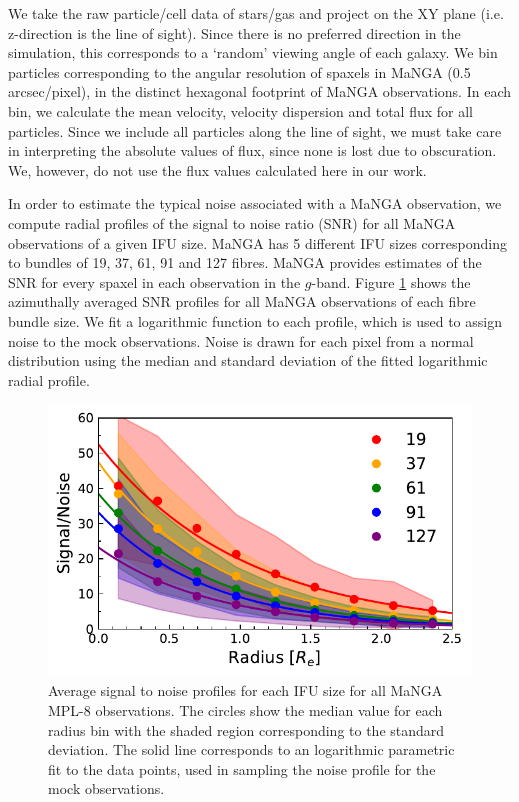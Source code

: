 We take the raw particle/cell data of stars/gas and project on the XY plane (i.e. z-direction is the line of sight). Since there is no preferred direction in the simulation, this corresponds to a `random' viewing angle of each galaxy. We bin particles corresponding to the angular resolution of spaxels in MaNGA (0.5 arcsec/pixel), in the distinct hexagonal footprint of MaNGA observations. In each bin, we calculate the mean velocity, velocity dispersion and total flux for all particles. Since we include all particles along the line of sight, we must take care in interpreting the absolute values of flux, since none is lost due to obscuration. We, however, do not use the flux values calculated here in our work.

In order to estimate the typical noise associated with a MaNGA observation, we compute radial profiles of the signal to noise ratio (SNR) for all MaNGA observations of a given IFU size. MaNGA has 5 different IFU sizes corresponding to bundles of 19, 37, 61, 91 and 127 fibres. MaNGA provides estimates of the SNR for every spaxel in each observation in the $g$-band. Figure \ref{fig:noise_profile} shows the azimuthally averaged SNR profiles for all MaNGA observations of each fibre bundle size. We fit a logarithmic function to each profile, which is used to assign noise to the mock observations. Noise is drawn for each pixel from a normal distribution using the median and standard deviation of the fitted logarithmic radial profile.

\begin{figure}
    \centering
	\includegraphics[width=0.95\linewidth]{misalignment_TNG/noise_profiles_ifusize.pdf}
    \caption{Average signal to noise profiles for each IFU size for all MaNGA MPL-8 observations. The circles show the median value for each radius bin with the shaded region corresponding to the standard deviation. The solid line corresponds to an logarithmic parametric fit to the data points, used in sampling the noise profile for the mock observations.}
    \label{fig:noise_profile}
\end{figure}


